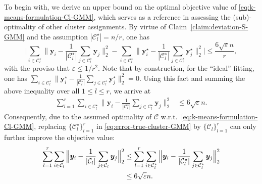 \bigskip
{}
To begin with, we derive an upper bound on the optimal objective value of \eqref{eq:k-means-formulation-Cl-GMM},
which serves as a reference in assessing the (sub)-optimality of other cluster assignments.
By virtue of Claim~\ref{claim:deviation-S-GMM} and the assumption $|\mathcal{C}_{l}^{\star}|=n/r$, one has
%
\[
\Bigg|\sum_{i\in\mathcal{C}_{l}^{\star}}\Big\|\bm{y}_{i}-\frac{1}{|\mathcal{C}_{l}^{\star}|}\sum_{j\in\mathcal{C}_{l}^{\star}}\bm{y}_{j}\Big\|_{2}^{2}-\sum_{i\in\mathcal{C}_{l}^{\star}}\Big\|\bm{y}_{i}^{\star}-\frac{1}{|\mathcal{C}_{l}^{\star}|}\sum_{j\in\mathcal{C}_{l}^{\star}}\bm{y}_{j}^{\star}\Big\|_{2}^{2}\Bigg|\leq\frac{6\sqrt{\varepsilon}n}{r},
\]
%
with the proviso that $\varepsilon \leq 1/r^2$.
Note that by construction,  for the ``ideal'' fitting,
one has $\sum_{i\in\mathcal{C}_{l}^{\star}}\big\|\bm{y}_{i}^{\star}-\frac{1}{|\mathcal{C}_{l}^{\star}|}\sum_{j\in\mathcal{C}_{l}^{\star}}\bm{y}_{j}^{\star}\big\|_{2}^{2}=0$.
Using this fact and summing the above inequality over
all $1\leq l \leq r$, we arrive at
%
\begin{align}
\sum_{l=1}^{r}\sum_{i\in\mathcal{C}_{l}^{\star}}\Big\|\bm{y}_{i}-\frac{1}{|\mathcal{C}_{l}^{\star}|}\sum_{j\in\mathcal{C}_{l}^{\star}}\bm{y}_{j}\Big\|_{2}^{2}
& \leq 6\sqrt{\varepsilon}n.
\label{eq:error-true-cluster-GMM}
\end{align}
%
Consequently, due to the assumed optimality of $\mathcal{C}$ w.r.t.~\eqref{eq:k-means-formulation-Cl-GMM},
replacing $\{\mathcal{C}_{l}^\star\}_{l=1}^r$ in \eqref{eq:error-true-cluster-GMM} by $\{\mathcal{C}_{l}\}_{l=1}^r$ can only further improve the objective value:
%
\begin{align}
\sum_{l=1}^{r}\sum_{i\in\mathcal{C}_{l}}\Big\|\bm{y}_{i}-\frac{1}{|\mathcal{C}_{l}|}\sum_{j\in\mathcal{C}_{l}}\bm{y}_{j}\Big\|_{2}^{2}
	& \leq \sum_{l=1}^{r}\sum_{i\in\mathcal{C}_{l}^{\star}}\Big\|\bm{y}_{i}-\frac{1}{|\mathcal{C}_{l}^{\star}|}\sum_{j\in\mathcal{C}_{l}^{\star}}\bm{y}_{j}\Big\|_{2}^{2}
	\notag\\
&  \leq 6\sqrt{\varepsilon}n.
\label{eq:error-optimizer-cluster-GMM}
\end{align}




